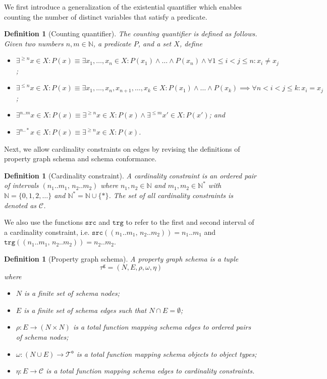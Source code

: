 \documentclass{article}
\newtheorem{definition}[theorem]{Definition}
\newcommand{\N}{\mathbb{N}}
\newcommand{\src}{\mathtt{src}}
\newcommand{\trg}{\mathtt{trg}}
\newcommand{\otypes}{\mathcal{T}^\mathsf{o}}
\newcommand{\gtype}{\tau^\mathsf{g}}
\begin{document}
We first introduce a generalization of the existential quantifier which enables counting the number of distinct variables that satisfy a predicate.

\begin{definition}[Counting quantifier]
  The \emph{counting quantifier} is defined as follows. Given two numbers $n, m \in \N$, a predicate $P$, and a set $X$, define
  \begin{itemize}
    \item $\exists^{\geq n} x \in X : P(x) \equiv \exists x_1, \ldots, x_n \in X : P(x_1) \wedge \ldots \wedge P(x_n) \wedge \forall 1 \leq i < j \leq n : x_i \neq x_j$;
    \item $\exists^{\leq n} x \in X : P(x) \equiv \exists x_1, \ldots, x_n, x_{n+1}, \ldots, x_k \in X : P(x_1) \wedge \ldots \wedge P(x_k) \implies \forall n < i < j \leq k : x_i = x_j$;
    \item $\exists^{n..m} x \in X : P(x) \equiv \exists^{\geq n} x \in X : P(x) \wedge \exists^{\leq m} x' \in X : P(x')$; and
    \item $\exists^{n..*} x \in X : P(x) \equiv \exists^{\geq n} x \in X : P(x)$.
  \end{itemize}
\end{definition}

Next, we allow cardinality constraints on edges by revising the definitions of property graph schema and schema conformance.

\begin{definition}[Cardinality constraint]
  A \emph{cardinality constraint} is an ordered pair of intervals $(n_1..m_1, \, n_2..m_2)$ where $n_1, n_2 \in \N$ and $m_1, m_2 \in \N^*$ with $\N = \{0, 1, 2, \ldots\}$ and $\N^* = \N \cup \{*\}$. The set of all cardinality constraints is denoted as $\mathcal{C}$.
\end{definition}

We also use the functions $\src$ and $\trg$ to refer to the first and second interval of a cardinality constraint, i.e. $\src((n_1..m_1, \, n_2..m_2)) = n_1..m_1$ and $\trg((n_1..m_1, \, n_2..m_2)) = n_2..m_2$.

\begin{definition}[Property graph schema]
  A \emph{property graph schema} is a tuple $$\gtype = (N, E, \rho, \omega, \eta)$$ where
  \begin{itemize}
    \item $N$ is a finite set of schema nodes;
    \item $E$ is a finite set of schema edges such that $N \cap E = \emptyset$;
    \item $\rho : E \to (N \times N)$ is a total function mapping schema edges to ordered pairs of schema nodes;
    \item $\omega : (N \cup E) \to \otypes$ is a total function mapping schema objects to object types;
    \item $\eta : E \to \mathcal{C}$ is a total function mapping schema edges to cardinality constraints.
  \end{itemize}
\end{definition}
\end{document}
